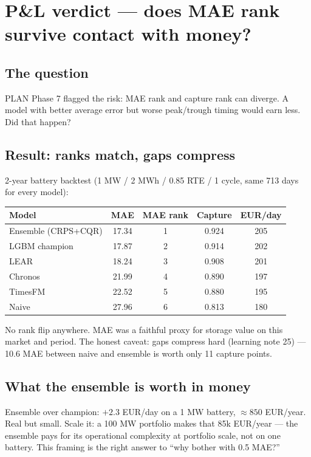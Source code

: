 \section{P\&L verdict --- does MAE rank survive contact with money?}

\subsection{The question}

PLAN Phase 7 flagged the risk: MAE rank and capture rank can
diverge. A model with better average error but worse peak/trough
timing would earn less. Did that happen?

\subsection{Result: ranks match, gaps compress}

2-year battery backtest (1 MW / 2 MWh / 0.85 RTE / 1 cycle,
same 713 days for every model):

\begin{tabular}{lcccc}
\hline
Model & MAE & MAE rank & Capture & EUR/day \\
\hline
Ensemble (CRPS+CQR) & 17.34 & 1 & 0.924 & 205 \\
LGBM champion & 17.87 & 2 & 0.914 & 202 \\
LEAR & 18.24 & 3 & 0.908 & 201 \\
Chronos & 21.99 & 4 & 0.890 & 197 \\
TimesFM & 22.52 & 5 & 0.880 & 195 \\
Naive & 27.96 & 6 & 0.813 & 180 \\
\hline
\end{tabular}

\vspace{0.5em}
No rank flip anywhere. MAE was a faithful proxy for storage value
on this market and period. The honest caveat: gaps compress hard
(learning note 25) --- 10.6 MAE between naive and ensemble is worth
only 11 capture points.

\subsection{What the ensemble is worth in money}

Ensemble over champion: $+2.3$ EUR/day on a 1 MW battery,
$\approx 850$ EUR/year. Real but small. Scale it: a 100 MW
portfolio makes that 85k EUR/year --- the ensemble pays for its
operational complexity at portfolio scale, not on one battery.
This framing is the right answer to ``why bother with 0.5 MAE?''


